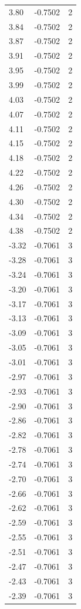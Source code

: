 \begin{longtable}{lrr}
  3.80 & -0.7502 & 2 \\
  3.84 & -0.7502 & 2 \\
  3.87 & -0.7502 & 2 \\
  3.91 & -0.7502 & 2 \\
  3.95 & -0.7502 & 2 \\
  3.99 & -0.7502 & 2 \\
  4.03 & -0.7502 & 2 \\
  4.07 & -0.7502 & 2 \\
  4.11 & -0.7502 & 2 \\
  4.15 & -0.7502 & 2 \\
  4.18 & -0.7502 & 2 \\
  4.22 & -0.7502 & 2 \\
  4.26 & -0.7502 & 2 \\
  4.30 & -0.7502 & 2 \\
  4.34 & -0.7502 & 2 \\
  4.38 & -0.7502 & 2 \\
  -3.32 & -0.7061 & 3 \\
  -3.28 & -0.7061 & 3 \\
  -3.24 & -0.7061 & 3 \\
  -3.20 & -0.7061 & 3 \\
  -3.17 & -0.7061 & 3 \\
  -3.13 & -0.7061 & 3 \\
  -3.09 & -0.7061 & 3 \\
  -3.05 & -0.7061 & 3 \\
  -3.01 & -0.7061 & 3 \\
  -2.97 & -0.7061 & 3 \\
  -2.93 & -0.7061 & 3 \\
  -2.90 & -0.7061 & 3 \\
  -2.86 & -0.7061 & 3 \\
  -2.82 & -0.7061 & 3 \\
  -2.78 & -0.7061 & 3 \\
  -2.74 & -0.7061 & 3 \\
  -2.70 & -0.7061 & 3 \\
  -2.66 & -0.7061 & 3 \\
  -2.62 & -0.7061 & 3 \\
  -2.59 & -0.7061 & 3 \\
  -2.55 & -0.7061 & 3 \\
  -2.51 & -0.7061 & 3 \\
  -2.47 & -0.7061 & 3 \\
  -2.43 & -0.7061 & 3 \\
  -2.39 & -0.7061 & 3 \\

\end{longtable}
